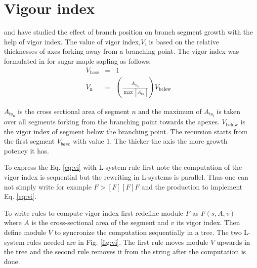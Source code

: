 \section{Vigour index}\label{sec:vi}
\citet{nikinmaa:00} and \citet{goulet:00} have studied the effect of branch
position on branch  segment growth with the help  of vigor index.  The
value of vigor index,$V$, is based on the relative thicknesses of axes
forking away from a branching point. The vigor index was formulated in
\citet{perttunen:01} for sugar maple sapling as follows:
\begin{eqnarray}
  \label{eq:vi}
  V_{\mathrm{base}} & = & 1 \nonumber \\
  V_{\mathrm{n}} & = & \left(\frac{A_{\mathrm{ts_{n}}}}{\max\left[A_{\mathrm{ts_{i}}}\right]}\right) V_{\mathrm{below}}
\end{eqnarray}

$A_{\mathrm{ts_{n}}}$ is  the cross sectional area of  segment $n$ and
the  maximum  of  $A_{\mathrm{ts_{i}}}$  is taken  over  all  segments
forking    from   the    branching   point    towards    the   apexes.
$V_\mathrm{below}$ is  the vigor index of segment  below the branching
point.  The  recursion starts from  the first segment  $V_{base}$ with
value 1. The thicker the axis the more growth potency it has.

To  express the  Eq.  \ref{eq:vi}  with L-system  rule first  note the
computation  of the  vigor index  is sequential  but the  rewriting in
L-systems is parallel. Thus one can  not simply write for example $F >
\left[F\right] \left[F\right]  F$ and  the production  to implement
Eq. \ref{eq:vi}.

To write  rules to  compute vigor index  first redefine module  $F$ as
$F(s,A,v)$ where  $A$ is the  cross-sectional area of the  segment and
$v$  its  vigor index.   Then  define  module  $V$ to  syncronize  the
computation sequentially in a tree.  The two L-system rules needed are
in Fig. \ref{fig:vi}.  The first rule moves module  $V$ upwards in the
tree  and  the  second rule  removes  it  from  the string  after  the
computation is done.


